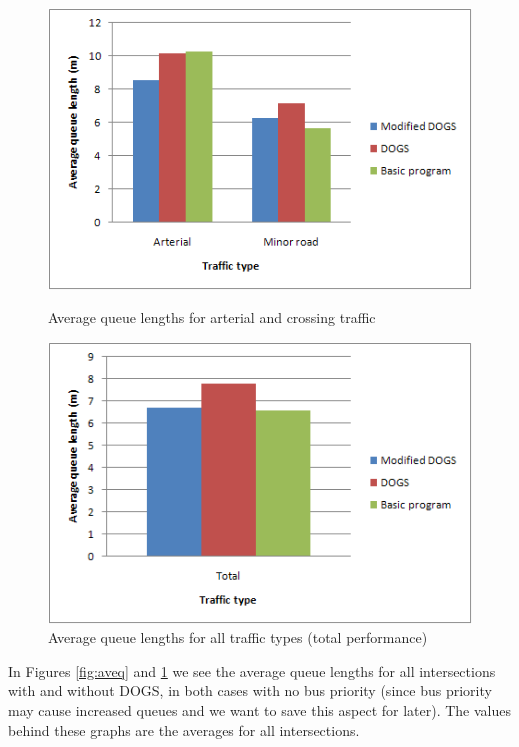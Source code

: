 \begin{figure}[ht]

    \begin{minipage}[b]{0.5\linewidth}

\centering
\includegraphics[scale=0.40]{aveq.png}
\caption{Average queue lengths for arterial and crossing traffic}
\label{fig:aveq}

    \end{minipage}
    \hspace{0.5cm}
    \begin{minipage}[b]{0.5\linewidth}

\centering
\includegraphics[scale=0.40]{aveq_total.png}
\caption{Average queue lengths for all traffic types (total performance)}
\label{fig:aveq_tot}

    \end{minipage}

\end{figure}

In Figures \ref{fig:aveq} and \ref{fig:aveq_tot} we see the average queue lengths for all intersections with and without DOGS, in both cases with no bus priority (since bus priority may cause increased queues and we want to save this aspect for later). The values behind these graphs are the averages for all intersections.

